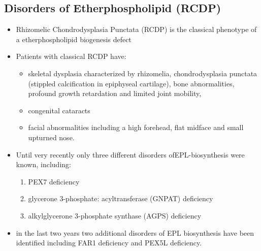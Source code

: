\documentclass{scrartcl}
\begin{document}
\subsection{Disorders of Etherphospholipid (RCDP)}
\label{sec:orgba451d0}
\begin{itemize}
\item Rhizomelic Chondrodysplasia Punctata (RCDP) is the classical
phenotype of a etherphospholipid biogenesis defect

\item Patients with classical RCDP have:
\begin{itemize}
\item skeletal dysplasia characterized by rhizomelia, chondrodysplasia punctata (stippled calcification in epiphyseal cartilage), bone abnormalities, profound growth retardation and limited joint mobility,
\item congenital cataracts
\item facial abnormalities including a high forehead, flat midface and small upturned nose.
\end{itemize}
\item Until very recently only three different disorders ofEPL-biosynthesis were known, including:
\begin{enumerate}
\item PEX7 deficiency
\item glycerone 3-phosphate: acyltransferase (GNPAT) deficiency
\item alkylglycerone 3-phosphate synthase (AGPS) deficiency
\end{enumerate}

\item in the last two years two additional disorders of EPL biosynthesis have been identified including FAR1 deficiency and PEX5L deficiency.
\end{itemize}
\end{document}
